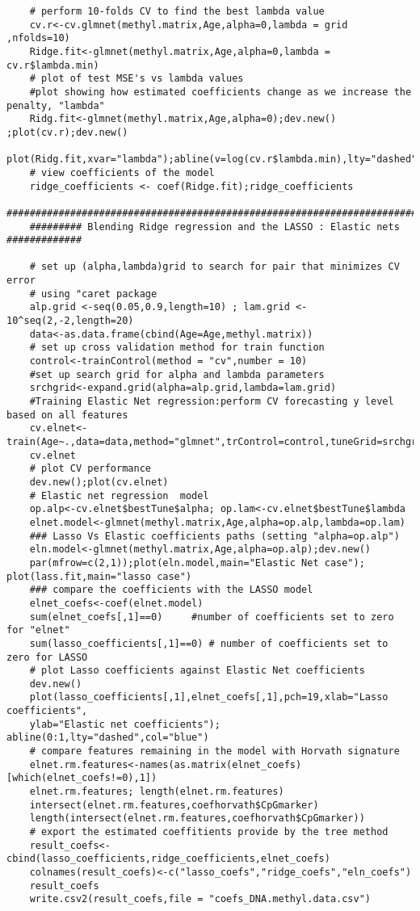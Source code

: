 \documentclass[12pt]{report}
\begin{document}
\begin{lstlisting}
	# perform 10-folds CV to find the best lambda value
	cv.r<-cv.glmnet(methyl.matrix,Age,alpha=0,lambda = grid ,nfolds=10)
	Ridge.fit<-glmnet(methyl.matrix,Age,alpha=0,lambda = cv.r$lambda.min)
	# plot of test MSE's vs lambda values
	#plot showing how estimated coefficients change as we increase the penalty, "lambda"
	Ridg.fit<-glmnet(methyl.matrix,Age,alpha=0);dev.new() ;plot(cv.r);dev.new() 
	plot(Ridg.fit,xvar="lambda");abline(v=log(cv.r$lambda.min),lty="dashed")
	# view coefficients of the model
	ridge_coefficients <- coef(Ridge.fit);ridge_coefficients
	##############################################################################
	######### Blending Ridge regression and the LASSO : Elastic nets #############
	
	# set up (alpha,lambda)grid to search for pair that minimizes CV error 
	# using "caret package
	alp.grid <-seq(0.05,0.9,length=10) ; lam.grid <- 10^seq(2,-2,length=20)
	data<-as.data.frame(cbind(Age=Age,methyl.matrix))
	# set up cross validation method for train function
	control<-trainControl(method = "cv",number = 10)
	#set up search grid for alpha and lambda parameters
	srchgrid<-expand.grid(alpha=alp.grid,lambda=lam.grid)
	#Training Elastic Net regression:perform CV forecasting y level based on all features
	cv.elnet<-train(Age~.,data=data,method="glmnet",trControl=control,tuneGrid=srchgrid)
	cv.elnet
	# plot CV performance
	dev.new();plot(cv.elnet)
	# Elastic net regression  model 
	op.alp<-cv.elnet$bestTune$alpha; op.lam<-cv.elnet$bestTune$lambda
	elnet.model<-glmnet(methyl.matrix,Age,alpha=op.alp,lambda=op.lam)
	### Lasso Vs Elastic coefficients paths (setting "alpha=op.alp") 
	eln.model<-glmnet(methyl.matrix,Age,alpha=op.alp);dev.new()
	par(mfrow=c(2,1));plot(eln.model,main="Elastic Net case"); plot(lass.fit,main="lasso case")
	### compare the coefficients with the LASSO model
	elnet_coefs<-coef(elnet.model)
	sum(elnet_coefs[,1]==0)     #number of coefficients set to zero for "elnet"
	sum(lasso_coefficients[,1]==0) # number of coefficients set to zero for LASSO
	# plot Lasso coefficients against Elastic Net coefficients
	dev.new()
	plot(lasso_coefficients[,1],elnet_coefs[,1],pch=19,xlab="Lasso coefficients",
	ylab="Elastic net coefficients"); abline(0:1,lty="dashed",col="blue")
	# compare features remaining in the model with Horvath signature
	elnet.rm.features<-names(as.matrix(elnet_coefs)[which(elnet_coefs!=0),1])
	elnet.rm.features; length(elnet.rm.features)
	intersect(elnet.rm.features,coefhorvath$CpGmarker)
	length(intersect(elnet.rm.features,coefhorvath$CpGmarker))
	# export the estimated coeffitients provide by the tree method
	result_coefs<-cbind(lasso_coefficients,ridge_coefficients,elnet_coefs)
	colnames(result_coefs)<-c("lasso_coefs","ridge_coefs","eln_coefs")
	result_coefs
	write.csv2(result_coefs,file = "coefs_DNA.methyl.data.csv")
\end{lstlisting}
\end{document}
